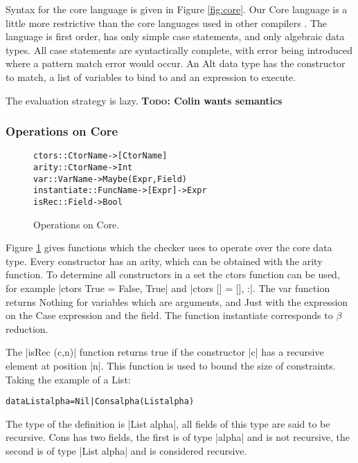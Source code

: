 \documentclass[preprint]{sigplanconf}
\newcommand{\C}[1]{\textsf{#1}}
\newcommand{\todo}[1]{\textbf{\textsc{Todo:} #1}}
\newenvironment{code}{\begin{alltt}\small}{\end{alltt}}
\begin{document}
Syntax for the core language is given in Figure \ref{fig:core}. Our Core language is a little more restrictive than the core languages used in other compilers \citep{ghc_core}. The language is first order, has only simple case statements, and only algebraic data types. All case statements are syntactically complete, with error being introduced where a pattern match error would occur. An \C{Alt} data type has the constructor to match, a list of variables to bind to and an expression to execute.

The evaluation strategy is lazy. \todo{Colin wants semantics}

\subsubsection{Operations on Core}

\begin{figure}
\begin{code}
ctors        :: CtorName  -> [CtorName]
arity        :: CtorName  -> Int
var          :: VarName   -> Maybe (Expr, Field)
instantiate  :: FuncName  -> [Expr] -> Expr
isRec        :: Field     -> Bool
\end{code}
\caption{Operations on Core.}
\label{fig:core_operations}
\end{figure}

Figure \ref{fig:core_operations} gives functions which the checker uses to operate over the core data type. Every constructor has an arity, which can be obtained with the \C{arity} function. To determine all constructors in a set the \C{ctors} function can be used, for example |ctors True = {False, True}| and |ctors [] = {[], :}|. The \C{var} function returns \C{Nothing} for variables which are arguments, and \C{Just} with the expression on the \C{Case} expression and the field. The function \C{instantiate} corresponds to $\beta$ reduction.

The |isRec (c,n)| function returns true if the constructor |c| has a recursive element at position |n|. This function is used to bound the size of constraints. Taking the example of a \C{List}:

\begin{code}
data List alpha = Nil | Cons alpha (List alpha)
\end{code}

The type of the definition is |List alpha|, all fields of this type are said to be recursive. \C{Cons} has two fields, the first is of type |alpha| and is not recursive, the second is of type |List alpha| and is considered recursive.
\end{document}
